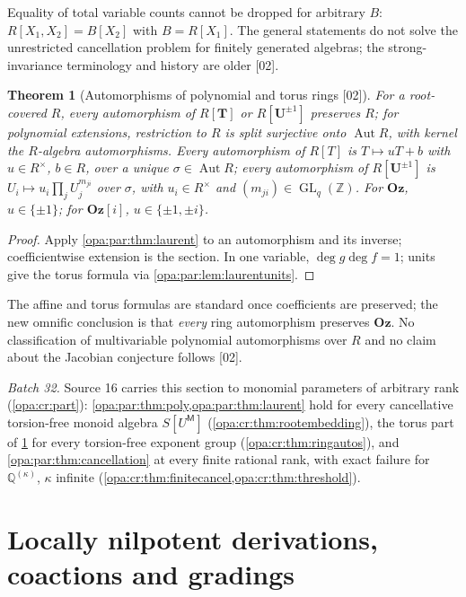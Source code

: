 \documentclass[11pt,oneside]{article}
\numberwithin{equation}{section}
\newtheorem{theorem}{Theorem}[section]
\theoremstyle{definition}
\theoremstyle{remark}
\newcommand{\Oz}{\mathbf{Oz}}
\newcommand{\Og}{\mathbf{Oz}[i]}
\newcommand{\Q}{\mathbb Q}
\newcommand{\Z}{\mathbb Z}
\newcommand{\Aut}{\operatorname{Aut}}
\newcommand{\GL}{\operatorname{GL}}
\newcommand{\src}[1]{\textup{\textsf{\small[#1]}}}
\begin{document}
Equality of total variable counts cannot be dropped for arbitrary $B$:
$R[X_1,X_2]=B[X_2]$ with $B=R[X_1]$. The general statements do not solve the
unrestricted cancellation problem for finitely generated algebras; the
strong-invariance terminology and history are older \cite{Hirano} \src{02}.

\begin{theorem}[Automorphisms of polynomial and torus rings \src{02}]\label{opa:par:thm:aut}
For a root-covered $R$, every automorphism of $R[\mathbf T]$ or $R[\mathbf U^{\pm1}]$
preserves $R$; for polynomial extensions, restriction to $R$ is split surjective onto
$\Aut R$, with kernel the $R$-algebra automorphisms. Every automorphism of $R[T]$ is $T\mapsto uT+b$ with $u\in R^\times$,
$b\in R$, over a unique $\sigma\in\Aut R$; every automorphism of
$R[\mathbf U^{\pm1}]$ is $U_i\mapsto u_i\prod_jU_j^{m_{ji}}$ over $\sigma$, with
$u_i\in R^\times$ and $(m_{ji})\in\GL_q(\Z)$. For $\Oz$, $u\in\{\pm1\}$; for $\Og$,
$u\in\{\pm1,\pm i\}$.
\end{theorem}
\begin{proof}
Apply \cref{opa:par:thm:laurent} to an automorphism and its inverse; coefficientwise
extension is the section. In one variable, $\deg g\deg f=1$; units give the torus
formula via \cref{opa:par:lem:laurentunits}.
\end{proof}

The affine and torus formulas are standard once coefficients are preserved; the new
omnific conclusion is that \emph{every} ring automorphism preserves $\Oz$. No
classification of multivariable polynomial automorphisms over $R$ and no claim about
the Jacobian conjecture follows \src{02}.

\emph{Batch 32.} Source 16 carries this section to monomial parameters of arbitrary rank
(\cref{opa:cr:part}): \cref{opa:par:thm:poly,opa:par:thm:laurent} hold for every cancellative
torsion-free monoid algebra $S[U^{\mathsf M}]$ (\cref{opa:cr:thm:rootembedding}), the torus part of
\cref{opa:par:thm:aut} for every torsion-free exponent group (\cref{opa:cr:thm:ringautos}), and
\cref{opa:par:thm:cancellation} at every finite rational rank, with exact failure for
$\Q^{(\kappa)}$, $\kappa$ infinite (\cref{opa:cr:thm:finitecancel,opa:cr:thm:threshold}).

\section{Locally nilpotent derivations, coactions and gradings}\label{opa:par:sec:lnd}
\end{document}
